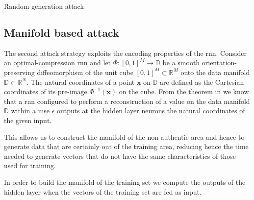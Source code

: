 \documentclass[draftcls,onecolumn,12pt]{IEEEtran}
\begin{document}
\begin{algorithm}[t]
  \scriptsize

 

    
 \caption{Random generation attack}
\end{algorithm}


\subsection{Manifold based attack}
The second attack strategy exploits the encoding properties of the \ac{rnn}. Consider an optimal-compression \ac{rnn} \cite{hecht-95} and let $\Phi:[0,1]^M \to \mathbb{D}$ be a smooth orientation-preserving diffeomorphism of the unit cube $[0,1]^M \subset \mathbb{R}^M$ onto the data manifold $\mathbb{D} \subset \mathbb{R}^N$. The natural coordinates of a point $\bm{x}$ on $\mathbb{D}$ are defined as the Cartesian coordinates of its pre-image $\Phi^{-1}(\bm{x})$ on the cube. From the theorem in \cite{hecht-95} we know that a \ac{rnn} configured to perform a reconstruction of a value on the data manifold $\mathbb{D}$ within a \ac{mse} $\epsilon$ outputs at the hidden layer neurons the natural coordinates of the given input.

This allows us to construct the manifold of the non-authentic area and hence to generate data that are certainly out of the training area, reducing hence the time needed to generate vectors that do not have the same characteristics of those used for training.

In order to build the manifold of the training set we compute the outputs of the hidden layer when the vectors of the training set are fed as input. 
\end{document}
